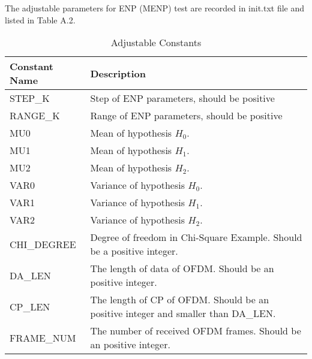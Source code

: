 The adjustable parameters for ENP (MENP) test are recorded in init.txt file and listed in Table A.2. 
\begin{table}[h]
\begin{tabular}{l|p{350pt}} 
\hline
\hline
Constant Name & Description                                                                                           \\
\hline
STEP\_K       & Step of ENP parameters, should be positive                                                            \\
RANGE\_K      & Range of ENP parameters, should be positive                                                           \\
MU0		  &  Mean of hypothesis $H_0$.\\
MU1		  & Mean of hypothesis $H_1$.\\
MU2       & Mean of hypothesis $H_2$.\\
VAR0      &    Variance of hypothesis $H_0$.\\
VAR1		&	Variance of hypothesis $H_1$.\\
VAR2		&		Variance of hypothesis $H_2$.\\
CHI\_DEGREE   & Degree of freedom in Chi-Square Example. Should be a positive integer.                                \\
DA\_LEN       & The length of data of OFDM. Should be an positive integer.                      \\
CP\_LEN       & The length of CP of OFDM. Should be an positive integer and smaller than DA\_LEN. \\
FRAME\_NUM    & The number of received OFDM frames. Should be an positive integer.\\
\hline                                   
\end{tabular}
\label{constantlist}
\caption{Adjustable Constants}
\end{table}

